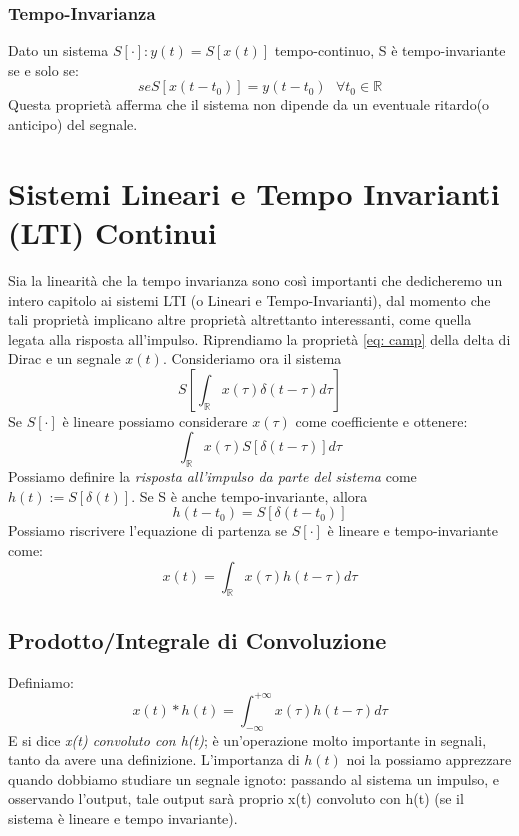 \subsubsection{Tempo-Invarianza} \label{prop: TI}
Dato un sistema $S[\cdot] : y(t) = S[x(t)]$ tempo-continuo, S è tempo-invariante se e solo se:\\
\begin{equation}
    se S[x(t - t_0)] = y(t - t_0) \mbox{   } \forall t_0 \in \mathbb{R}
\end{equation}
Questa proprietà afferma che il sistema non dipende da un eventuale ritardo(o anticipo) del segnale.


\section{Sistemi Lineari e Tempo Invarianti (LTI) Continui}
Sia la linearità che la tempo invarianza sono così importanti che dedicheremo un intero capitolo ai sistemi LTI (o Lineari e Tempo-Invarianti), dal momento
che tali proprietà implicano altre proprietà altrettanto interessanti, come quella legata alla risposta all'impulso.
Riprendiamo la proprietà \eqref{eq: camp} della delta di Dirac e un segnale $x(t)$. Consideriamo ora il sistema
\begin{equation*}
    S\left[\int_{\mathbb{R}}x(\tau)\delta(t - \tau) d\tau\right]
\end{equation*}
Se $S[\cdot]$ è lineare possiamo considerare $x(\tau)$ come coefficiente e ottenere:
\begin{equation}
    \int_{\mathbb{R}}x(\tau) S\left[\delta(t - \tau) \right]d\tau
\end{equation}
Possiamo definire la \textit{risposta all'impulso da parte del sistema} come $h(t) := S[\delta(t)]$.
Se S è anche tempo-invariante, allora
\begin{equation}
    h(t - t_0) = S[\delta(t - t_0)]
\end{equation}
Possiamo riscrivere l'equazione di partenza se $S[\cdot]$ è lineare e tempo-invariante come:
\begin{equation}
    x(t) = \int_{\mathbb{R}}x(\tau)h(t - \tau) d\tau
\end{equation}

\subsection{Prodotto/Integrale di Convoluzione}
Definiamo:
\begin{equation}
    x(t) \ast h(t) = \int_{-\infty}^{+\infty} x(\tau)h(t - \tau) d\tau
\end{equation}
E si dice \textit{x(t) convoluto con h(t)}; è un'operazione molto importante in segnali, tanto da avere una definizione.
L'importanza di $h(t)$ noi la possiamo apprezzare quando dobbiamo studiare un segnale ignoto: passando al sistema un impulso, 
e osservando l'output, tale output sarà proprio x(t) convoluto con h(t) (se il sistema è lineare e tempo invariante).